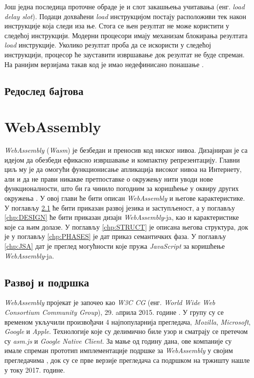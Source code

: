 \documentclass[12pt,oneside]{memoir}
\begin{document}
Још једна последица проточне обраде је и слот закашњења учитавања (енг. \textit{load delay slot}). Подаци дохваћени
\textit{load} инструкцијом постају расположиви тек након инструкције која следи иза ње. Стога се њен резултат не
може користити у следећој инструкцији. Модерни процесори имају механизам блокирања резултата \textit{load}
инструкције. Уколико резултат проба да се искористи у следећој инструкцији, процесор ће зауставити извршавање док
резултат не буде спреман. На ранијим верзијама такав код је имао недефинисано понашање \cite{SMR}.

\section{Редослед бајтова} \label{chp:ENDIANNESS}

\chapter{WebAssembly}

\textit{WebAssembly} (\textit{Wasm}) је безбедан и преносив код ниског нивоа. Дизајниран је са
идејом да обезбеди ефикасно извршавање и компактну репрезентацију. Главни циљ му је да омогући функционисање
апликација високог нивоа на Интернету, али и да не прави никакве претпоставке о окружењу нити уводи нове функционалности,
што би га чинило погодним за коришћење у оквиру других окружења \cite{WASMS}. У овој глави ће бити описан
\textit{WebAssembly} и његове карактеристике. У поглављу \ref{chp:SUPP} ће бити приказан развој језика и заступљеност, а
у поглављу \ref{chp:DESIGN} ће бити приказан дизајн \textit{WebAssembly}-ja, као и карактеристике које са њим долазе.
У поглављу \ref{chp:STRUCT} је описана његова структура, док је у поглављу \ref{chp:PHASES} је дат приказ семантичких
фаза. У поглављу \ref{chp:JSA} дат је преглед могућности које пружа \textit{JavaScript} за коришћење
\textit{WebAssembly}-ja.

\section{Развој и подршка} \label{chp:SUPP}

\textit{WebAssembly} пројекат је започео као \textit{W3C CG} (енг. \textit{World Wide Web Consortium Community Group}),
29. aприла 2015. године \cite{WASMCG}. У групу су се временом укључили произвођачи 4 најпопуларнија прегледача, \textit{Mozilla},
\textit{Microsoft}, \textit{Google} и \textit{Apple}. Технологије које су делимично биле узор и сматрају се претечом су \textit{asm.js} и
\textit{Google Native Client}. За мање од годину дана, ове компаније су имале спреман прототип имплементације
подршке за \textit{WebAssembly} у својим прегледачима \cite{WASMEXP}, док су се прве верзије прегледача са подршком на тржишту нашле у току
2017. године.
\end{document}
